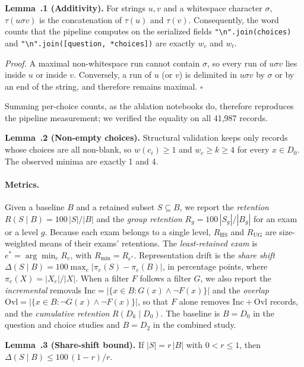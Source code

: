 \medskip\noindent\textbf{Lemma~\thesection.1 (Additivity).} For strings $u,v$
and a whitespace character $\sigma$, $\tau(u\sigma v)$ is the concatenation of
$\tau(u)$ and $\tau(v)$. Consequently, the word counts that the pipeline
computes on the serialized fields \texttt{"\textbackslash n".join(choices)}
and \texttt{"\textbackslash n".join([question, *choices])} are exactly $w_c$
and $w_t$.

\noindent\emph{Proof.} A maximal non-whitespace run cannot contain $\sigma$,
so every run of $u\sigma v$ lies inside $u$ or inside $v$. Conversely, a run
of $u$ (or $v$) is delimited in $u\sigma v$ by $\sigma$ or by an end of the
string, and therefore remains maximal. $\square$

\smallskip\noindent Summing per-choice counts, as the ablation notebooks do,
therefore reproduces the pipeline measurement; we verified the equality on all
41,987 records.

\medskip\noindent\textbf{Lemma~\thesection.2 (Non-empty choices).} Structural
validation keeps only records whose choices are all non-blank, so
$w(c_i) \ge 1$ and $w_c \ge k \ge 4$ for every $x \in D_0$. The observed
minima are exactly 1 and 4.

\paragraph{Metrics.} Given a baseline $B$ and a retained subset
$S \subseteq B$, we report the \emph{retention}
$R(S \mid B) = 100\,|S|/|B|$ and the \emph{group retention}
$R_g = 100\,|S_g|/|B_g|$ for an exam or a level $g$. Because each exam belongs
to a single level, $R_{\mathrm{HS}}$ and $R_{\mathrm{UG}}$ are size-weighted
means of their exams' retentions. The \emph{least-retained exam} is
$e^{*} = \arg\min_e R_e$, with $R_{\min} = R_{e^{*}}$. Representation drift is
the \emph{share shift}
$\Delta(S \mid B) = 100 \max_e |\pi_e(S) - \pi_e(B)|$, in percentage points,
where $\pi_e(X) = |X_e|/|X|$. When a filter $F$ follows a filter $G$, we also
report the \emph{incremental} removals
$\mathrm{Inc} = |\{x \in B : G(x) \wedge \neg F(x)\}|$ and the \emph{overlap}
$\mathrm{Ovl} = |\{x \in B : \neg G(x) \wedge \neg F(x)\}|$, so that $F$ alone
removes $\mathrm{Inc} + \mathrm{Ovl}$ records, and the \emph{cumulative
retention} $R(D_k \mid D_0)$. The baseline is $B = D_0$ in the question and
choice studies and $B = D_2$ in the combined study.

\medskip\noindent\textbf{Lemma~\thesection.3 (Share-shift bound).} If
$|S| = r\,|B|$ with $0 < r \le 1$, then
$\Delta(S \mid B) \le 100\,(1-r)/r$.

